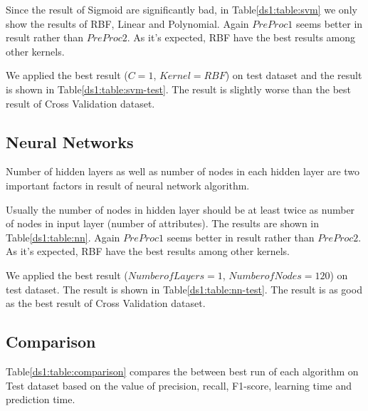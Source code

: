 Since the result of Sigmoid are significantly bad, in Table\ref{ds1:table:svm} we only show the results of RBF, Linear and Polynomial. Again $PreProc1$ seems better in result rather than $PreProc2$. As it's expected, RBF have the best results among other kernels.

We applied the best result ($C=1$, $Kernel=RBF$) on test dataset and the result is shown in Table\ref{ds1:table:svm-test}. The result is slightly worse than the best result of Cross Validation dataset.

\subsection{Neural Networks}
Number of hidden layers as well as number of nodes in each hidden layer are two important factors in result of neural network algorithm. 

Usually the number of nodes in hidden layer should be at least twice as number of nodes in input layer (number of attributes). The results are shown in Table\ref{ds1:table:nn}. Again $PreProc1$ seems better in result rather than $PreProc2$. As it's expected, RBF have the best results among other kernels.

We applied the best result ($Number of Layers=1$, $Number of Nodes=120$) on test dataset. The result is shown in Table\ref{ds1:table:nn-test}. The result is as good as the best result of Cross Validation dataset.

\subsection{Comparison}
Table\ref{ds1:table:comparison} compares the between best run of each algorithm on Test dataset based on the value of precision, recall, F1-score, learning time and prediction time.

